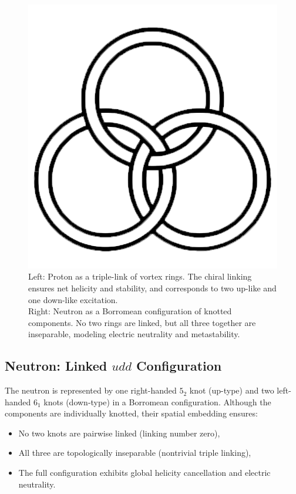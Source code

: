 \documentclass[12pt]{article}
\begin{document}
\begin{figure}[H]
\begin{minipage}{0.25\textwidth}
            \includegraphics[width=\textwidth]{images/borromean}
\end{minipage}
    \caption{Left: Proton as a triple-link of vortex rings. The chiral linking ensures net helicity and stability, and corresponds to two up-like and one down-like excitation.\\
      Right: Neutron as a Borromean configuration of knotted components. No two rings are linked, but all three together are inseparable, modeling electric neutrality and metastability.}
\end{figure}

\subsection{Neutron: Linked \(udd\) Configuration}

The neutron is represented by one right-handed \( 5_2 \) knot (up-type) and two left-handed \( 6_1 \) knots (down-type) in a Borromean configuration. Although the components are individually knotted, their spatial embedding ensures:

\begin{itemize}
    \item No two knots are pairwise linked (linking number zero),
    \item All three are topologically inseparable (nontrivial triple linking),
    \item The full configuration exhibits global helicity cancellation and electric neutrality.
\end{itemize}
\end{document}
